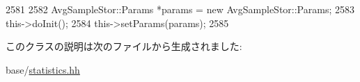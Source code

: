 \begin{DoxyCode}
2581     {
2582         AvgSampleStor::Params *params = new AvgSampleStor::Params;
2583         this->doInit();
2584         this->setParams(params);
2585     }
\end{DoxyCode}


このクラスの説明は次のファイルから生成されました:\begin{DoxyCompactItemize}
\item 
base/\hyperlink{statistics_8hh}{statistics.hh}\end{DoxyCompactItemize}
